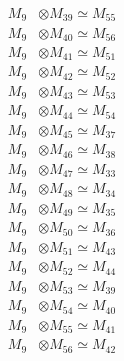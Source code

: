 \begin{align*}
M_{9} &\otimes M_{39} \simeq M_{55} \\
M_{9} &\otimes M_{40} \simeq M_{56} \\
M_{9} &\otimes M_{41} \simeq M_{51} \\
M_{9} &\otimes M_{42} \simeq M_{52} \\
M_{9} &\otimes M_{43} \simeq M_{53} \\
M_{9} &\otimes M_{44} \simeq M_{54} \\
M_{9} &\otimes M_{45} \simeq M_{37} \\
M_{9} &\otimes M_{46} \simeq M_{38} \\
M_{9} &\otimes M_{47} \simeq M_{33} \\
M_{9} &\otimes M_{48} \simeq M_{34} \\
M_{9} &\otimes M_{49} \simeq M_{35} \\
M_{9} &\otimes M_{50} \simeq M_{36} \\
M_{9} &\otimes M_{51} \simeq M_{43} \\
M_{9} &\otimes M_{52} \simeq M_{44} \\
M_{9} &\otimes M_{53} \simeq M_{39} \\
M_{9} &\otimes M_{54} \simeq M_{40} \\
M_{9} &\otimes M_{55} \simeq M_{41} \\
M_{9} &\otimes M_{56} \simeq M_{42} \\
\end{align*}


